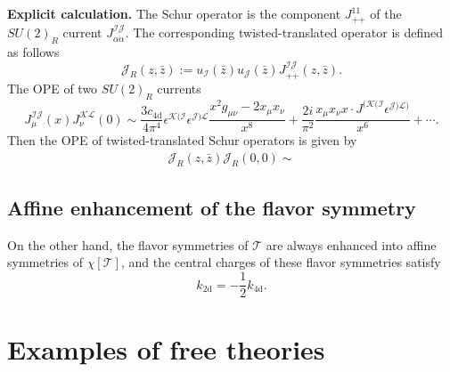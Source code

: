 \documentclass[a4paper,11pt]{article}
\begin{document}
\bigskip
\noindent\textbf{Explicit calculation.} The Schur operator is the component $J^{11}_{+\dot{+}}$ of the $SU(2)_R$ current $J^{\mathcal{I} \mathcal{J}}_{\alpha \dot{\alpha}}$. The corresponding twisted-translated operator is defined as follows
\begin{equation}
    \mathcal{J}_R(z, \bar{z}) := u_\mathcal{I}(\bar{z}) u_\mathcal{J}(\bar{z}) J^{\mathcal{IJ}}_{+\dot{+}}(z, \bar{z}).
\end{equation}
The OPE of two $SU(2)_R$ currents
\begin{equation}
    J_\mu^\mathcal{IJ}(x) J_\nu^\mathcal{KL}(0) \sim \frac{3 c_\mathrm{4d}}{4 \pi^4} \epsilon^{\mathcal{K}(\mathcal{I}} \epsilon^{\mathcal{J})\mathcal{L}} \frac{x^2 g_{\mu \nu} - 2 x_\mu x_\nu}{x^8} + \frac{2i}{\pi^2} \frac{x_\mu x_\nu x \cdot J^{(\mathcal{K} ( \mathcal{I}} \epsilon^{\mathcal{J}) \mathcal{L}) } }{x^6} + \cdots.
\end{equation}
Then the OPE of twisted-translated Schur operators is given by
\begin{equation}
\begin{aligned}
    \mathcal{J}_R(z, \bar{z}) \mathcal{J}_R(0,0) \sim 
\end{aligned}
\end{equation}

\subsection{Affine enhancement of the flavor symmetry}
On the other hand, the flavor symmetries of $\mathcal{T}$ are always enhanced into affine symmetries of $\chi[\mathcal{T}]$, and the central charges of these flavor symmetries satisfy
\begin{equation}
    k_\mathrm{2d} = -\frac{1}{2} k_\mathrm{4d}.
\end{equation}

\section{Examples of free theories}
\end{document}
